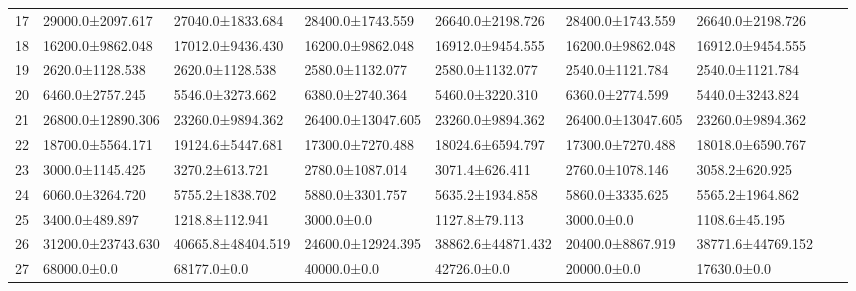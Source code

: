 \begin{tabular}{|r|l|l|l|l|l|l|l|l|}
  17 & 29000.0±2097.617 & 27040.0±1833.684 & 28400.0±1743.559 & 26640.0±2198.726 & 28400.0±1743.559 & 26640.0±2198.726 \\ 
  18 & 16200.0±9862.048 & 17012.0±9436.430 & 16200.0±9862.048 & 16912.0±9454.555 & 16200.0±9862.048 & 16912.0±9454.555 \\ 
  19 & 2620.0±1128.538 & 2620.0±1128.538 & 2580.0±1132.077 & 2580.0±1132.077 & 2540.0±1121.784 & 2540.0±1121.784 \\ 
  20 & 6460.0±2757.245 & 5546.0±3273.662 & 6380.0±2740.364 & 5460.0±3220.310 & 6360.0±2774.599 & 5440.0±3243.824 \\ 
  21 & 26800.0±12890.306 & 23260.0±9894.362 & 26400.0±13047.605 & 23260.0±9894.362 & 26400.0±13047.605 & 23260.0±9894.362 \\ 
  22 & 18700.0±5564.171 & 19124.6±5447.681 & 17300.0±7270.488 & 18024.6±6594.797 & 17300.0±7270.488 & 18018.0±6590.767 \\ 
  23 & 3000.0±1145.425 & 3270.2±613.721 & 2780.0±1087.014 & 3071.4±626.411 & 2760.0±1078.146 & 3058.2±620.925 \\ 
  24 & 6060.0±3264.720 & 5755.2±1838.702 & 5880.0±3301.757 & 5635.2±1934.858 & 5860.0±3335.625 & 5565.2±1964.862 \\ 
  25 & 3400.0±489.897 & 1218.8±112.941 & 3000.0±0.0 & 1127.8±79.113 & 3000.0±0.0 & 1108.6±45.195 \\ 
  26 & 31200.0±23743.630 & 40665.8±48404.519 & 24600.0±12924.395 & 38862.6±44871.432 & 20400.0±8867.919 & 38771.6±44769.152 \\ 
  27 & 68000.0±0.0 & 68177.0±0.0 & 40000.0±0.0 & 42726.0±0.0 & 20000.0±0.0 & 17630.0±0.0 \\ 
\end{tabular}
